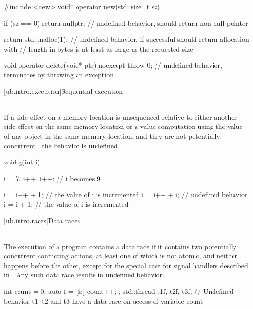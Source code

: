 \pnum
\begin{example}
\begin{codeblock}
#include <new>
void* operator new(std::size_t sz) {
  if (sz == 0)
    return nullptr;             // undefined behavior,  should return non-null pointer

  return std::malloc(1);        // undefined behavior, if successful should return allocation with
                                // length in bytes is at least as large as the requested size
}
void operator delete(void* ptr) noexcept {
  throw 0;                      // undefined behavior, terminates by throwing an exception
}
\end{codeblock}
\end{example}

[ub.intro.execution]{Sequential execution}

\pnum
{} \\
If a side effect on a
memory location  is unsequenced relative to either another side effect on the same memory location or
a value computation using the value of any object in the same memory location, and they are not potentially
concurrent , the behavior is undefined.

\pnum
\begin{example}
\begin{codeblock}
void g(int i) {
  i = 7, i++, i++;  // i becomes 9

  i = i++ + 1;  // the value of i is incremented
  i = i++ + i;  // undefined behavior
  i = i + 1;    // the value of i is incremented
}
\end{codeblock}
\end{example}

[ub.intro.races]{Data races}

\pnum
{} \\
The execution of a program contains a data race if it contains two potentially concurrent conflicting actions,
at least one of which is not atomic, and neither happens before the other, except for the special case for
signal handlers described in . Any such data race results in undefined behavior.

\pnum
\begin{example}
\begin{codeblock}
int count = 0;
auto f = [&] { count++; };
std::thread t1{f}, t2{f}, t3{f};
// Undefined behavior t1, t2 and t3 have a data race on access of variable count
\end{codeblock}
\end{example}



